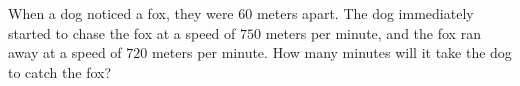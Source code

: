 When a dog noticed a fox, they were $60$ meters apart. The dog immediately started to chase the fox at a speed of $750$ meters per minute, and the fox ran away at a speed of $720$ meters per minute. How many minutes will it take the dog to catch the fox?
